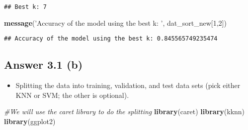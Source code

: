 \documentclass[
]{article}
\newenvironment{Shaded}{\begin{snugshade}}{\end{snugshade}}
\newcommand{\CommentTok}[1]{\textcolor[rgb]{0.56,0.35,0.01}{\textit{#1}}}
\newcommand{\DecValTok}[1]{\textcolor[rgb]{0.00,0.00,0.81}{#1}}
\newcommand{\KeywordTok}[1]{\textcolor[rgb]{0.13,0.29,0.53}{\textbf{#1}}}
\newcommand{\NormalTok}[1]{#1}
\newcommand{\StringTok}[1]{\textcolor[rgb]{0.31,0.60,0.02}{#1}}
\providecommand{\tightlist}{%
  \setlength{\itemsep}{0pt}\setlength{\parskip}{0pt}}
\begin{document}
\begin{verbatim}
## Best k: 7
\end{verbatim}

\begin{Shaded}
\begin{Highlighting}[]
\KeywordTok{message}\NormalTok{(}\StringTok{'Accuracy of the model using the best k: '}\NormalTok{, dat_sort_new[}\DecValTok{1}\NormalTok{,}\DecValTok{2}\NormalTok{])}
\end{Highlighting}
\end{Shaded}

\begin{verbatim}
## Accuracy of the model using the best k: 0.845565749235474
\end{verbatim}

\hypertarget{answer-3.1-b}{%
\subsection{Answer 3.1 (b)}\label{answer-3.1-b}}

\begin{itemize}
\tightlist
\item
  Splitting the data into training, validation, and test data sets (pick
  either KNN or SVM; the other is optional).
\end{itemize}

\begin{Shaded}
\begin{Highlighting}[]
\CommentTok{#We will use the caret library to do the splitting}
\KeywordTok{library}\NormalTok{(caret)}
\KeywordTok{library}\NormalTok{(kknn)}
\KeywordTok{library}\NormalTok{(ggplot2)}
\end{Highlighting}
\end{Shaded}
\end{document}
